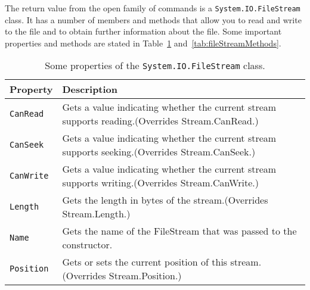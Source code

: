 \begin{comment}
    \lstinline{FileShare.} & Description\\
    \hline
    \lstinline{Delete} &  Other programs may delete the file.\\
    \hline
    \lstinline{Inheritable} & Makes the file handle inheritable by child processes.\\
    \hline
    \lstinline{None} & Other programs may not access the file.\\
    \hline
    \lstinline{Read} & Other programs may open and read the file.\\
    \hline
    \lstinline{ReadWrite} & Other programs may read from and write to the file.\\
    \hline
    \lstinline{Write} & Other programs may write to the file.\\
    \hline
  \end{tabularx}
\end{center}
\end{comment}
The return value from the open family of commands is a \lstinline!System.IO.FileStream! class. It has a number of members and methods that allow you to read and write to the file and to obtain further information about the file. Some important properties and methods are stated in Table~\ref{tab:fileStreamProperties} and~\ref{tab:fileStreamMethods}.
\begin{table}
  \centering
  \begin{tabularx}{\linewidth}{|l|X|}
    \hline
    Property & Description\\
    \hline
    \lstinline{CanRead} & Gets a value indicating whether the current stream supports reading.(Overrides Stream.CanRead.)\\
    \hline
    \lstinline{CanSeek} & Gets a value indicating whether the current stream supports seeking.(Overrides Stream.CanSeek.)\\
    \hline
    \lstinline{CanWrite} & Gets a value indicating whether the current stream supports writing.(Overrides Stream.CanWrite.)\\
    \hline
    \lstinline{Length} & Gets the length in bytes of the stream.(Overrides Stream.Length.)\\
    \hline
    \lstinline{Name} & Gets the name of the FileStream that was passed to the constructor.\\
    \hline
    \lstinline{Position} & Gets or sets the current position of this stream.(Overrides Stream.Position.)\\
    \hline
  \end{tabularx}
  \caption{Some properties of the \lstinline!System.IO.FileStream! class.}
  \label{tab:fileStreamProperties}
\end{table}
